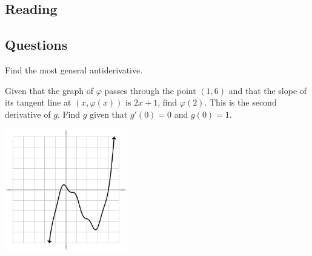


\subsection*{Reading}

\subsection*{Questions}
\begin{questions}
  \question Find the most general antiderivative.
  \question Given that the graph of $ \varphi $ passes through the point $ (1, 6) $
            and that the slope of its tangent line at $ (x, \varphi(x)) $ is $ 2x + 1 $,
            find $ \varphi(2) $.
  \question This is the second derivative of $ g $. Find $ g $ given that $ g'(0) = 0 $ and $ g(0) = 1 $.
            \begin{center}
              \includegraphics[width=0.4\textwidth]{anti7}
            \end{center}
\end{questions}


